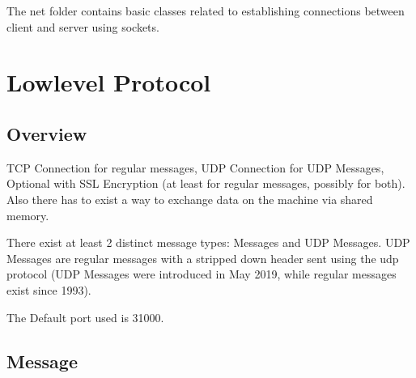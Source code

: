 \renewcommand{\namespace}{kernel::net::}


\newenvironment{messagetypes}{\rowcolors{2}{evnt.light}{evnt.dark}\mbox{}\\
	\begin{longtable}{||p{7.4cm}|p{.5cm}|p{6cm}||} 
		\rowcolor{evnt.head} \hline \textbf{Name} & \textbf{ID} & \textbf{Comment} \\ \hline\hline}{\end{longtable}}

\newenvironment{messagedesc}{\rowcolors{2}{evnt.light}{evnt.dark}\mbox{}\\
	\begin{longtable}{||p{3.4cm}|p{2.5cm}|p{8cm}||}
		\rowcolor{evnt.head} \hline \textbf{Name} & \textbf{Length} & \textbf{Comment} \\ \hline\hline}{\end{longtable}}

\newcommand{\messageType}[3]{\lstinline|#1| & #2 & #3 \\
	\hline}

The net folder contains basic classes related to establishing connections between client and server using sockets.

\section{Lowlevel Protocol}

\subsection{Overview}

TCP Connection for regular messages, UDP Connection for UDP Messages, Optional with SSL Encryption (at least for regular messages, possibly for both). Also there has to exist a way to exchange data on the machine via shared memory.

There exist at least 2 distinct message types: Messages and UDP Messages. UDP Messages are regular messages with a stripped down header sent using the udp protocol (UDP Messages were introduced in May 2019, while regular messages exist since 1993).

The Default port used is 31000.



\subsection{Message}


